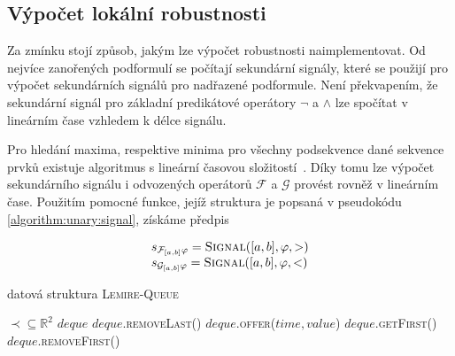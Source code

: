 \subsection{Výpočet lokální robustnosti}

Za zmínku stojí způsob, jakým lze výpočet robustnosti naimplementovat. Od nejvíce zanořených
podformulí se počítají sekundární signály, které se použijí pro výpočet sekundárních signálů
pro nadřazené podformule. Není překvapením, že sekundární signál pro základní predikátové operátory
$\neg$ a $\wedge$ lze spočítat v lineárním čase vzhledem k délce signálu.

Pro hledání maxima,
respektive minima pro všechny podsekvence dané sekvence prvků existuje algoritmus s lineární časovou složitostí~\cite{lemire2006}. Díky tomu lze
výpočet sekundárního signálu i odvozených operátorů $\mathcal{F}$ a $\mathcal{G}$ pro\-vést
rovněž v lineárním čase. Použitím pomocné funkce, jejíž struktura je popsaná v pseudokódu \ref{algorithm:unary:signal},
získáme předpis 

\begin{align}\label{eq:future:gloabally:robustness:impl}
\begin{array}{ll}
s_{\mathcal{F}_{[a,b]}\varphi} = \textsc{Signal}([a,b], \varphi, >)				\\
s_{\mathcal{G}_{[a,b]}\varphi} = \textsc{Signal}([a,b], \varphi, <)
\end{array}
\end{align}

\begin{algorithm}
\caption{datová struktura \textsc{Lemire-Queue}\cite{lemire2006}}
\begin{algorithmic}[1]
\Require 	$\prec \subseteq \mathbb{R}^2$ 
\State $deque$ 
		\State $deque$.\textsc{removeLast()}
	\EndWhile
	\State $deque$.\textsc{offer(}$time, value$\textsc{)}
\EndFunction
{}
	\State\Return $deque$.\textsc{getFirst()}
\EndFunction
{}
	\State\Return $deque$.\textsc{removeFirst()}
\EndFunction
\end{algorithmic}
\end{algorithm}

